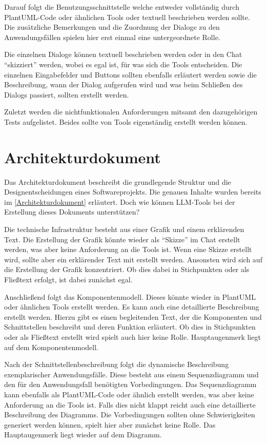 Darauf folgt die Benutzungsschnittstelle welche entweder vollständig durch PlantUML-Code oder ähnlichen Tools 
oder textuell beschrieben werden sollte. Die zusätzliche Bemerkungen und die Zuordnung der Dialoge zu den Anwendungsfällen 
spielen hier erst einmal eine untergeordnete Rolle.

Die einzelnen Dialoge können textuell beschrieben werden oder in den Chat ``skizziert'' werden, wobei es egal ist, 
für was sich die Tools entscheiden. Die einzelnen Eingabefelder und Buttons sollten ebenfalls erläutert werden sowie 
die Beschreibung, wann der Dialog aufgerufen wird und was beim Schließen des Dialogs passiert, sollten erstellt werden.

Zuletzt werden die nichtfunktionalen Anforderungen mitsamt den dazugehörigen Tests aufgelistet. Beides sollte 
von Tools eigenständig erstellt werden können.

\section{Architekturdokument}  \label{LLMArchitekturdokument}

Das Architekturdokument beschreibt die grundlegende Struktur und die Designentscheidungen eines Softwareprojekts. 
Die genauen Inhalte wurden bereits im \autoref{Architekturdokument} erläutert. Doch wie können LLM-Tools bei der 
Erstellung dieses Dokuments unterstützen?

Die technische Infrastruktur besteht aus einer Grafik und einem erklärenden Text. Die Erstellung der Grafik 
könnte wieder als ``Skizze'' im Chat erstellt werden, was aber keine Anforderung an die Tools ist. Wenn 
eine Skizze erstellt wird, sollte aber ein erklärender Text mit erstellt werden. Ansonsten wird sich auf 
die Erstellung der Grafik konzentriert. Ob dies dabei in Stichpunkten oder als Fließtext erfolgt, ist dabei 
zunächst egal.

Anschließend folgt das Komponentenmodell. Dieses könnte wieder in PlantUML oder ähnlichen Tools erstellt 
werden. Es kann auch eine detaillierte Beschreibung erstellt werden. Hierzu gibt es einen begleitenden Text, der die 
Komponenten und Schnittstellen beschreibt und deren Funktion erläutert. Ob dies in Stichpunkten oder als 
Fließtext erstellt wird spielt auch hier keine Rolle. Hauptaugenmerk liegt auf dem Komponentenmodell.



Nach der Schnittstellenbeschreibung folgt die dynamische Beschreibung exemplarischer Anwendungsfälle. Diese besteht 
aus einem Sequenzdiagramm und den für den Anwendungsfall benötigten Vorbedingungen. Das Sequenzdiagramm kann ebenfalls 
als PlantUML-Code oder ähnlich erstellt werden, was aber keine Anforderung an die Tools ist. Falls dies nicht klappt 
reicht auch eine detaillierte Beschreibung des Diagramms. Die Vorbedingungen sollten ohne Schwierigkeiten 
generiert werden können, spielt hier aber zunächst keine Rolle. Das Hauptaugenmerk liegt wieder auf dem Diagramm.


